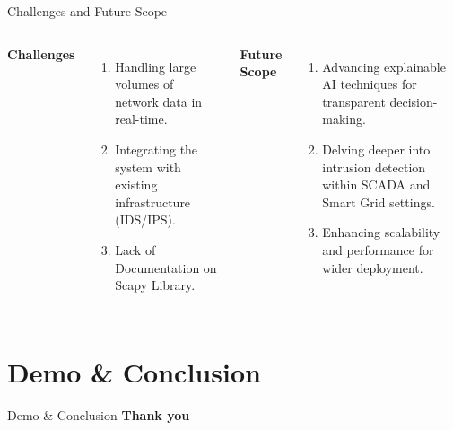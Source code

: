 \documentclass{beamer}
\begin{document}
\begin{frame}{Challenges and Future Scope}
    \begin{columns}
        \textbf{Challenges}
        \begin{enumerate}
            \item Handling large volumes of network data in real-time.
            \item Integrating the system with existing infrastructure (IDS/IPS).
            \item Lack of Documentation on Scapy Library.
        \end{enumerate}
        \textbf{Future Scope}
        \begin{enumerate}
            \item Advancing explainable AI techniques for transparent decision-making.
            \item Delving deeper into intrusion detection within SCADA and Smart Grid settings.
            \item Enhancing scalability and performance for wider deployment.
        \end{enumerate}
        \end{columns}

\end{frame}

\section{Demo \& Conclusion}
\begin{frame}{Demo \& Conclusion}
    \huge{\textbf{Thank you}}
\end{frame}
\end{document}

